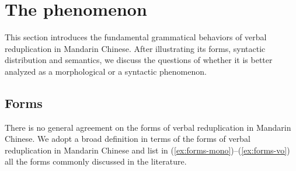\section{The phenomenon}\label{sec:phen}

This section introduces the fundamental grammatical behaviors of verbal reduplication in Mandarin Chinese.
 After illustrating its forms, syntactic distribution and semantics, 
 we discuss the questions of whether it is better analyzed as a morphological or a syntactic phenomenon.


\subsection{Forms}\label{sec:forms}

There is no general agreement on the forms of verbal reduplication in Mandarin Chinese.
We adopt a broad definition in terms of the forms of verbal reduplication in Mandarin Chinese 
and list in (\ref{ex:forms-mono})--(\ref{ex:forms-vo}) all the forms commonly discussed in the literature.

\settowidth{}

